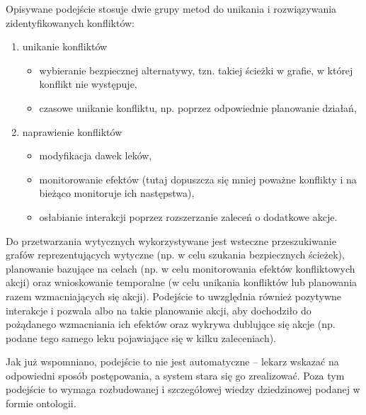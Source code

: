 Opisywane podejście stosuje dwie grupy metod do unikania i rozwiązywania zidentyfikowanych konfliktów:
\begin{enumerate}
	\item unikanie konfliktów
	\begin{itemize}
		\item wybieranie bezpiecznej alternatywy, tzn. takiej ścieżki w grafie, w której konflikt nie występuje,
		\item czasowe unikanie konfliktu, np. poprzez odpowiednie planowanie działań,
	\end{itemize}
	\item naprawienie konfliktów
	\begin{itemize}
		\item modyfikacja dawek leków,
		\item monitorowanie efektów (tutaj dopuszcza się mniej poważne konflikty i na bieżąco monitoruje ich następstwa),
		\item osłabianie interakcji poprzez rozszerzanie zaleceń o dodatkowe akcje.
	\end{itemize}
\end{enumerate}

Do przetwarzania wytycznych wykorzystywane jest wsteczne przeszukiwanie grafów reprezentujących wytyczne (np. w celu szukania bezpiecznych ścieżek), planowanie bazujące na celach (np. w celu monitorowania efektów konfliktowych akcji) oraz wnioskowanie temporalne (w celu unikania konfliktów lub planowania razem wzmacniających się akcji). Podejście to uwzględnia również pozytywne interakcje i pozwala albo na takie planowanie akcji, aby dochodziło do pożądanego wzmacniania ich efektów oraz wykrywa dublujące się akcje (np. podane tego samego leku pojawiające się w kilku zaleceniach).

Jak już wspomniano, podejście to nie jest automatyczne -- lekarz wskazać na odpowiedni sposób postępowania, a system stara się go zrealizować. Poza tym podejście to wymaga rozbudowanej i szczegółowej wiedzy dziedzinowej  podanej w formie ontologii.



